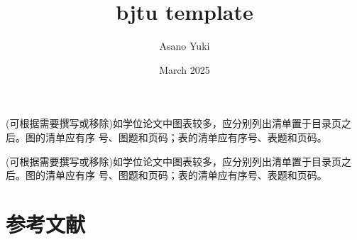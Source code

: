 \documentclass[final,AutoFakeBold,12pt]{bjtumaster}
\title{bjtu template}
\author{Asano Yuki}
\date{March 2025}
\begin{document}

\coverpages


\ackpages

\absntocpages

\cleardoublepage    
\tableofcontents            %

\cleardoublepage            %
\listoffigures              %
{(可根据需要撰写或移除)如学位论文中图表较多，应分别列出清单置于目录页之后。图的清单应有序
号、图题和页码；表的清单应有序号、表题和页码。 } %

\cleardoublepage            %
\listoftables               %
{(可根据需要撰写或移除)如学位论文中图表较多，应分别列出清单置于目录页之后。图的清单应有序
号、图题和页码；表的清单应有序号、表题和页码。 } %

\cleardoublepage            %
\printnomenclature          %

\mainpages


\cleardoublepage
{}
{}     %
\chapter*{参考文献}
\vspace{-40pt}
\wuhao



\bjtuappendix                               %

\end{document}

